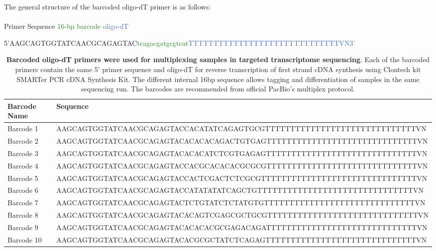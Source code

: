 \begin{landscape}
	The general structure of the barcoded oligo-dT primer is as follows:
	\\
	\\
	\hangindent=5cm \textcolor{RedOrange}{Primer Sequence} \hspace{2cm}   \textcolor{ForestGreen}{16-bp barcode}   \hspace{4cm} \textcolor{RoyalBlue}{oligo-dT}
	\begin{center}
		5'\textcolor{RedOrange}{AAGCAGTGGTATCAACGCAGAGTAC}\textcolor{ForestGreen}{tcagacgatgcgtcat}\textcolor{RoyalBlue}{TTTTTTTTTTTTTTTTTTTTTTTTTTTTTTVN3’}
	\end{center}
	\vspace{1cm}

	\begin{table}[ht]
		\captionsetup{justification=raggedright,width=1.45\textwidth}
		\caption[Barcoded Oligo-dT Primers for targeted transcriptome sequencing]%
		{\textbf{Barcoded oligo-dT primers were used for multiplexing samples in targeted transcriptome sequencing}. Each of the barcoded primers contain the same 5' primer sequence and oligo-dT for reverse transcription of first strand cDNA synthesis using Clontech kit SMARTer PCR cDNA Synthesis Kit. The different internal 16bp sequence allows tagging and differentiation of samples in the same sequencing run. The barcodes are recommended from official PacBio's multiplex protocol.}
		\label{tab:barcode_primers}
		\begin{tabularx}{1.45\textwidth}{ll}
			\toprule
			Barcode Name & Sequence                                                                  \\ \midrule
			Barcode 1    & AAGCAGTGGTATCAACGCAGAGTACCACATATCAGAGTGCGTTTTTTTTTTTTTTTTTTTTTTTTTTTTTTVN \\
			Barcode 2    & AAGCAGTGGTATCAACGCAGAGTACACACACAGACTGTGAGTTTTTTTTTTTTTTTTTTTTTTTTTTTTTTVN \\
			Barcode 3    & AAGCAGTGGTATCAACGCAGAGTACACACATCTCGTGAGAGTTTTTTTTTTTTTTTTTTTTTTTTTTTTTTVN \\
			Barcode 4    & AAGCAGTGGTATCAACGCAGAGTACCACGCACACACGCGCGTTTTTTTTTTTTTTTTTTTTTTTTTTTTTTVN \\
			Barcode 5    & AAGCAGTGGTATCAACGCAGAGTACCACTCGACTCTCGCGTTTTTTTTTTTTTTTTTTTTTTTTTTTTTTTVN \\
			Barcode 6    & AAGCAGTGGTATCAACGCAGAGTACCATATATATCAGCTGTTTTTTTTTTTTTTTTTTTTTTTTTTTTTTTVN \\
			Barcode 7    & AAGCAGTGGTATCAACGCAGAGTACTCTGTATCTCTATGTGTTTTTTTTTTTTTTTTTTTTTTTTTTTTTTVN \\
			Barcode 8    & AAGCAGTGGTATCAACGCAGAGTACACAGTCGAGCGCTGCGTTTTTTTTTTTTTTTTTTTTTTTTTTTTTTVN \\
			Barcode 9    & AAGCAGTGGTATCAACGCAGAGTACACACACGCGAGACAGATTTTTTTTTTTTTTTTTTTTTTTTTTTTTTVN \\
			Barcode 10 & AAGCAGTGGTATCAACGCAGAGTACACGCGCTATCTCAGAGTTTTTTTTTTTTTTTTTTTTTTTTTTTTTTVN \\ \bottomrule
		\end{tabularx}
	\end{table}
\end{landscape}


